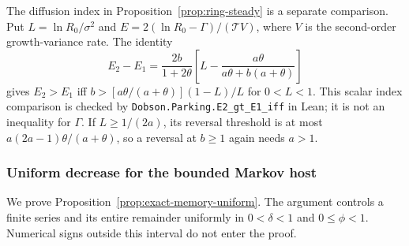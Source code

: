 The diffusion index in Proposition~\ref{prop:ring-steady} is a separate
comparison. Put $L=\ln R_0/\sigma^2$ and
$E=2(\ln R_0-\Gamma)/(\mathcal T V)$, where $V$ is the second-order
growth-variance rate. The identity
\begin{equation}
 E_2-E_1=\frac{2b}{1+2\theta}
 \left[L-\frac{a\theta}{a\theta+b(a+\theta)}\right]
 \label{eq:exact-mem-index}
\end{equation}
gives $E_2>E_1$ iff $b>[a\theta/(a+\theta)](1-L)/L$ for $0<L<1$.
This scalar index comparison is checked by \texttt{Dobson.Parking.E2\_gt\_E1\_iff}
in Lean; it is not an inequality for $\Gamma$. If $L\geq1/(2a)$, its reversal threshold is at most
$a(2a-1)\theta/(a+\theta)$, so a reversal at $b\geq1$ again needs $a>1$.

\subsubsection{Uniform decrease for the bounded Markov host}\label{subsec:exact-app-gap1}
We prove Proposition~\ref{prop:exact-memory-uniform}. The argument controls a finite series and its entire remainder uniformly in \(0<\delta<1\) and \(0\leq\phi<1\). Numerical signs outside this interval do not enter the proof.

